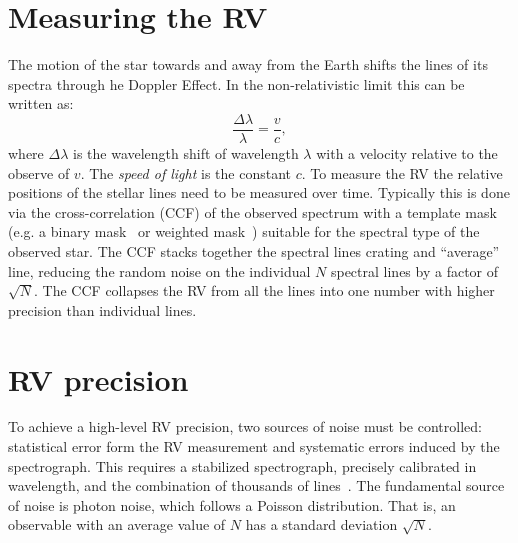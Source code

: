 
\section{Measuring the RV}
The motion of the star towards and away from the Earth shifts the lines of its spectra through he Doppler Effect.
In the non-relativistic limit this can be written as:
\begin{equation}
\frac{\Delta\lambda}{\lambda} = \frac{v}{c},
\end{equation}
where $\Delta\lambda$ is the wavelength shift of wavelength $\lambda$ with a velocity relative to the observe of \(v\).
The \emph{speed of light} is the constant $c$.
To measure the RV the relative positions of the stellar lines need to be measured over time.
Typically this is done via the cross-correlation ({CCF}) of the observed spectrum with a template mask (e.g. a binary mask~\citep{baranne_elodie_1996} or weighted mask~\citep{pepe_coralie_2002}) suitable for the spectral type of the observed star.
The {CCF} stacks together the spectral lines crating and ``average'' line, reducing the random noise on the individual $N$ spectral lines by a factor of $\sqrt{N}$.
The {CCF} collapses the RV from all the lines into one number with higher precision than individual lines.


\section{RV precision}
\label{section:rv_precision}
To achieve a high-level RV precision, two sources of noise must be controlled: statistical error form the RV measurement and systematic errors induced by the spectrograph.
This requires a stabilized spectrograph, precisely calibrated in wavelength, and the combination of thousands of lines~\citep[e.g.][]{pepe_instrumentation_2014}.
The fundamental source of noise is photon noise, which follows a {Poisson} distribution.
That is, an observable with an average value of $N$ has a standard deviation $\sqrt{N}$.

